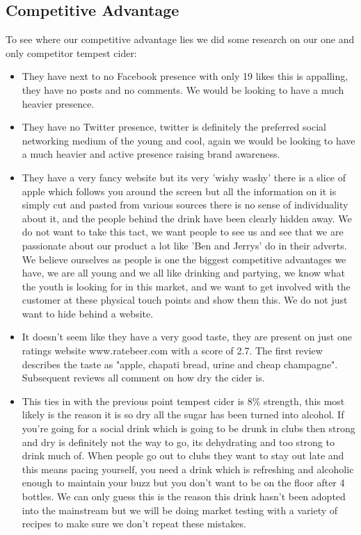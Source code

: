 \documentclass[11pt]{article}
\begin{document}
  \subsection{Competitive Advantage}
To see where our competitive advantage lies we did some research on our one and
only competitor tempest cider:

\begin{itemize}
	\item They have next to no Facebook presence with only 19 likes this is
appalling, they have no posts and no comments. We would be looking to have a
much heavier presence.
	\item They have no Twitter presence, twitter is definitely the preferred social
networking medium of the young and cool, again we would be looking to have a much
heavier and active presence raising brand awareness.
	\item They have a very fancy website but its very 'wishy washy' there is a slice
of apple which follows you around the screen but all the information on it is
simply cut and pasted from various sources there is no sense of individuality
about it, and the people behind the drink have been clearly hidden away. We do not
want to take this tact, we want people to see us and see that we are passionate
about our product a lot like 'Ben and Jerrys' do in their adverts. We believe
ourselves as people is one the biggest competitive advantages we have, we are all
young and we all like drinking and partying, we know what the youth is looking
for in this market, and we want to get involved with the customer at these
physical touch points and show them this. We do not just want to hide behind a
website. 
	\item It doesn't seem like they have a very good taste, they are present on just
one ratings website www.ratebeer.com with a score of 2.7. The first review
describes the taste as "apple, chapati bread, urine and cheap champagne".
Subsequent reviews all comment on how dry the cider is.
	\item This ties in with the previous point tempest cider is 8\% strength, this
most likely is the reason it is so dry all the sugar has been turned into
alcohol. If you're going for a social drink which is going to be drunk in clubs
then strong and dry is definitely not the way to go, its dehydrating and too
strong to drink much of. When people go out to clubs they want to stay out late
and this means pacing yourself, you need a drink which is refreshing and
alcoholic enough to maintain your buzz but you don't want to be on the floor
after 4 bottles. We can only guess this is the reason this drink hasn't been
adopted into the mainstream but we will be doing market testing with a variety
of recipes to make sure we don't repeat these mistakes.
\end{itemize}
\newpage
\end{document}
